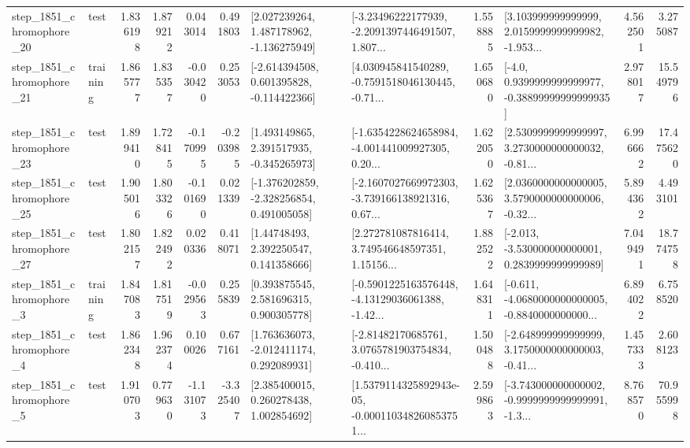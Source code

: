 \begin{tabular}{llrrrrllrlrr}
 step\_1851\_chromophore\_20 &      test &      1.836198 &    1.879212 &      0.043014 &  0.491803 &    [2.027239264, 1.487178962, -1.136275949] &  [-3.23496222177939, -2.2091397446491507, 1.807... &       1.558885 &  [3.103999999999999, 2.0159999999999982, -1.953... &            4.562501 &          3.275087 \\
 step\_1851\_chromophore\_21 &  training &      1.865777 &    1.835357 &     -0.030420 &  0.253053 &   [-2.614394508, 0.601395828, -0.114422366] &  [4.030945841540289, -0.7591518046130445, -0.71... &       1.650680 &   [-4.0, 0.9399999999999977, -0.38899999999999935] &            2.978017 &         15.549796 \\
 step\_1851\_chromophore\_23 &      test &      1.899410 &    1.728415 &     -0.170995 & -0.203985 &    [1.493149865, 2.391517935, -0.345265973] &  [-1.6354228624658984, -4.001441009927305, 0.20... &       1.622050 &  [2.5309999999999997, 3.2730000000000032, -0.81... &            6.996662 &         17.475620 \\
 step\_1851\_chromophore\_25 &      test &      1.905016 &    1.803326 &     -0.101690 &  0.021339 &   [-1.376202859, -2.328256854, 0.491005058] &  [-2.1607027669972303, -3.739166138921316, 0.67... &       1.625367 &  [2.0360000000000005, 3.5790000000000006, -0.32... &            5.894362 &          4.493101 \\
 step\_1851\_chromophore\_27 &      test &      1.802157 &    1.822492 &      0.020336 &  0.418071 &      [1.44748493, 2.392250547, 0.141358666] &  [2.272781087816414, 3.749546648597351, 1.15156... &       1.882522 &   [-2.013, -3.530000000000001, 0.2839999999999989] &            7.049491 &         18.774758 \\
  step\_1851\_chromophore\_3 &  training &      1.847083 &    1.817519 &     -0.029563 &  0.255839 &     [0.393875545, 2.581696315, 0.900305778] &  [-0.5901225163576448, -4.13129036061388, -1.42... &       1.648311 &  [-0.611, -4.0680000000000005, -0.8840000000000... &            6.894022 &          6.758520 \\
  step\_1851\_chromophore\_4 &      test &      1.862348 &    1.962374 &      0.100026 &  0.677161 &    [1.763636073, -2.012411174, 0.292089931] &  [-2.81482170685761, 3.0765781903754834, -0.410... &       1.500488 &  [-2.648999999999999, 3.1750000000000003, -0.41... &            1.457333 &          2.608123 \\
  step\_1851\_chromophore\_5 &      test &      1.910703 &    0.779630 &     -1.131073 & -3.325407 &     [2.385400015, 0.260278438, 1.002854692] &  [1.5379114325892943e-05, -0.000110348260853751... &       2.599863 &  [-3.743000000000002, -0.9999999999999991, -1.3... &            8.768570 &         70.955998 \\

\end{tabular}
